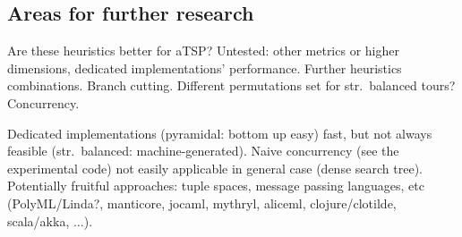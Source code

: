\documentclass[index=totoc,bibliography=totoc]{scrartcl}
\newcommand{\annotation}[1]{\marginpar{\small\itshape\color{green}#1}}
\numberwithin{equation}{section}
\numberwithin{figure}{section}
\numberwithin{table}{section}
\begin{document}
\subsection{Areas for further research}
\annotation{TODO}

Are these heuristics better for aTSP\@?
Untested: other metrics or higher dimensions, dedicated implementations' performance.
Further heuristics combinations.
Branch cutting.
Different permutations set for str.~balanced tours?
Concurrency.

\annotation{TODO}

Dedicated implementations (pyramidal: bottom up easy) fast, but not always feasible (str.~balanced: machine-generated).
Naive concurrency (see the {\ttfamily experimental} code) not easily applicable in general case (dense search tree).
Potentially fruitful approaches: tuple spaces, message passing languages, etc
(PolyML/Linda?, manticore, jocaml, mythryl, aliceml, clojure/clotilde, scala/akka, $\ldots$).


%

\end{document}
